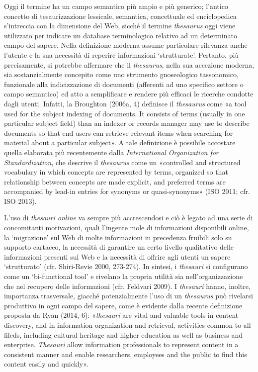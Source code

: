{Oggi il termine ha un campo semantico più ampio e più generico; l'antico
concetto di tesaurizzazione lessicale, semantica, concettuale ed
enciclopedica s'intreccia con la dimensione del Web, sicché il termine
\emph{thesaurus} oggi viene utilizzato per indicare un database
terminologico relativo ad un determinato campo del sapere. Nella
definizione moderna assume particolare rilevanza anche l'utente e la sua
necessità di reperire informazioni `strutturate'. Pertanto, più
precisamente, si potrebbe affermare che il \emph{thesaurus}, nella sua
accezione moderna, sia sostanzialmente concepito come uno strumento
gnoseologico tassonomico, funzionale alla indicizzazione di documenti
(afferenti ad uno specifico settore o campo semantico) ed atto a
semplificare e rendere più efficaci le ricerche condotte dagli utenti.
Infatti, la Broughton (2006a, 4) definisce il \emph{thesaurus} come «a
tool used for the subject indexing of documents. It consists of terms
(usually in one particular subject field) than an indexer or records
manager may use to describe documents so that end-users can retrieve
relevant items when searching for material about a particular subject».
A tale definizione è possibile accostare quella elaborata più
recentemente dalla \emph{International Organization for
Standardization}, che descrive il \emph{thesaurus} come un «controlled
and structured vocabulary in which concepts are represented by terms,
organized so that relationship between concepts are made explicit, and
preferred terms are accompanied by lead-in entries for synonyms or
quasi-synonyms» (ISO 2011; cfr. ISO 2013).

L'uso di \emph{thesauri online} va sempre più accrescendosi e ciò è
legato ad una serie di concomitanti motivazioni, quali l'ingente mole di
informazioni disponibili online, la `migrazione' sul Web di molte
informazioni in precedenza fruibili solo su supporto cartaceo, la
necessità di garantire un certo livello qualitativo delle informazioni
presenti sul Web e la necessità di offrire agli utenti un sapere
`strutturato' (cfr. Shiri-Revie 2000, 273-274). In sintesi, i
\emph{thesauri} si configurano come un `bi-functional tool' e rivelano
la propria utilità sia nell'organizzazione che nel recupero delle
informazioni (cfr. Feldvari 2009). I \emph{thesauri} hanno, inoltre,
importanza trasversale, giacché potenzialmente l'uso di un
\emph{thesaurus} può rivelarsi produttivo in ogni campo del sapere, come
è evidente dalla recente definizione proposta da Ryan (2014, 6):
«\emph{thesauri} are vital and valuable tools in content discovery, and
in information organization and retrieval, activities common to all
fileds, including cultural heritage and higher education as well as
business and enterprise. \emph{Thesauri} allow information professionals
to represent content in a consistent manner and enable researchers,
employees and the public to find this content easily and quickly».

}

